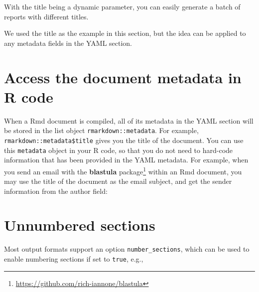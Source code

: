 \documentclass[
  11pt,
]{krantz}
\newenvironment{Shaded}{\begin{snugshade}}{\end{snugshade}}
\newcommand{\BaseNTok}[1]{\textcolor[rgb]{0.06,0.06,0.06}{#1}}
\newcommand{\NormalTok}[1]{#1}
\renewcommand{\href}[2]{#2\footnote{\url{#1}}}
\begin{document}
With the title being a dynamic parameter, you can easily generate a batch of reports with different titles.

We used the title as the example in this section, but the idea can be applied to any metadata fields in the YAML section.

\hypertarget{document-metadata}{%
\section{Access the document metadata in R code}\label{document-metadata}}

When a Rmd document is compiled, all of its metadata in the YAML section will be stored in the list object \texttt{rmarkdown::metadata}. For example, \texttt{rmarkdown::metadata\$title} gives you the title of the document. You can use this \texttt{metadata} object in your R code, so that you do not need to hard-code information that has been provided in the YAML metadata. For example, when you send an email with \href{https://github.com/rich-iannone/blastula}{the \textbf{blastula} package} within an Rmd document, you may use the title of the document as the email subject, and get the sender information from the author field:

\begin{Shaded}
\end{Shaded}

\hypertarget{unnumbered-sections}{%
\section{Unnumbered sections}\label{unnumbered-sections}}

Most output formats support an option \texttt{number\_sections}, which can be used to enable numbering sections if set to \texttt{true}, e.g.,
\end{document}
